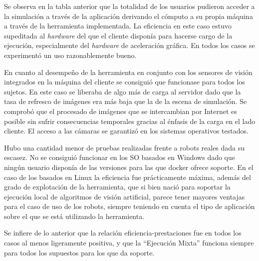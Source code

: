 Se observa en la tabla anterior que la totalidad de los usuarios pudieron acceder a la simulación a través de la aplicación derivando el cómputo a su propia máquina a través de la herramienta implementada. La eficiencia en este caso estuvo supeditada al \textit{hardware} del que el cliente disponía para hacerse cargo de la ejecución, especialmente del \textit{hardware} de aceleración gráfica. En todos los casos se experimentó un uso razonablemente bueno.

En cuanto al desempeño de la herramienta en conjunto con los sensores de visión integrados en la máquina del cliente se consiguió que funcionase para todos los sujetos. En este caso se liberaba de algo más de carga al servidor dado que la tasa de refresco de imágenes era más baja que la de la escena de simulación. Se comprobó que el procesado de imágenes que se intercambian por Internet es posible sin sufrir consecuencias temporales gracias al énfasis de la carga en el lado cliente. El acceso a las cámaras se garantizó en los sistemas operativos testados.

Hubo una cantidad menor de pruebas realizadas frente a robots reales dada su escasez. No se consiguió funcionar en los SO basados en Windows dado que ningún usuario disponía de las versiones para las que docker ofrece soporte. En el caso de los basados en Linux la eficiencia fue prácticamente máxima, además del grado de explotación de la herramienta, que si bien nació para soportar la ejecución local de algoritmos de visión artificial, parece tener mayores ventajas para el caso de uso de los robots, siempre teniendo en cuenta el tipo de aplicación sobre el que se está utilizando la herramienta. 

Se infiere de lo anterior que la relación eficiencia-prestaciones fue en todos los casos al menos ligeramente positiva, y que la ``Ejecución Mixta'' funciona siempre para todos los supuestos para los que da soporte.

